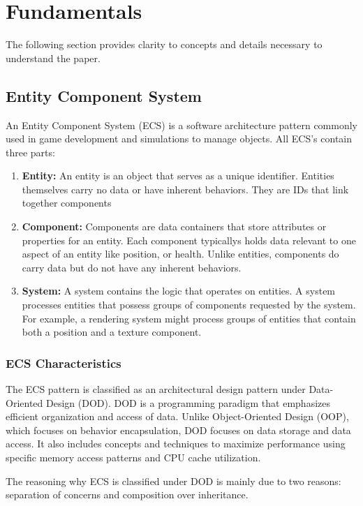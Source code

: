 \section{Fundamentals}

The following section provides clarity to concepts and details necessary to understand the paper.

\subsection{Entity Component System}
An Entity Component System (ECS) is a software architecture pattern commonly used in game development and simulations to manage objects. All ECS's contain three parts:
\begin{enumerate}
    \item \textbf{Entity:} An entity is an object that serves as a unique identifier. Entities themselves carry no data or have inherent behaviors. They are IDs that link together components
    \item \textbf{Component:} Components are data containers that store attributes or properties for an entity. Each component typicallys holds data relevant to one aspect of an entity like position, or health. Unlike entities, components do carry data but do not have any inherent behaviors.
    \item \textbf{System:} A system contains the logic that operates on entities. A system processes entities that possess groups of components requested by the system. For example, a rendering system might process groups of entities that contain both a position and a texture component. 
\end{enumerate}

\subsubsection{ECS Characteristics}
The ECS pattern is classified as an architectural design pattern under Data-Oriented Design (DOD). DOD is a programming paradigm that emphasizes efficient organization and access of data. Unlike Object-Oriented Design (OOP), which focuses on behavior encapsulation, DOD focuses on data storage and data access. It also includes concepts and techniques to maximize performance using specific memory access patterns and CPU cache utilization. 

The reasoning why ECS is classified under DOD is mainly due to two reasons: separation of concerns and composition over inheritance.

